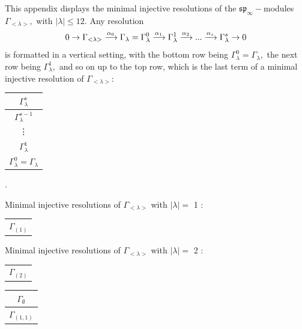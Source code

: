 \documentclass[main.tex]{subfiles}
\begin{document}
This appendix displays the minimal injective resolutions of the $\mathfrak{sp}_\infty-$modules $\Gamma_{<\lambda>},$ with $|\lambda|\leq 12$. Any resolution
$$0\to\Gamma_{<\lambda>}\xrightarrow[]{\alpha_0}\Gamma_{\lambda} = \Gamma_\lambda^0\xrightarrow[]{\alpha_1} \Gamma_\lambda^1\xrightarrow[]{\alpha_2} ...\xrightarrow[]{\alpha_{s}}\Gamma_\lambda^s \to 0$$ is formatted in a vertical setting, with the bottom row being $\Gamma^0_\lambda = \Gamma_\lambda,$ the next row being $\Gamma^1_\lambda,$ and so on up to the top row, which is the last term of a minimal injective resolution of $\Gamma_{<\lambda>}$: 
\begin{table}[H]
\centering
\begin{tabular}{c}
     $\Gamma_\lambda^s$ \\ \hline
     $\Gamma_\lambda^{s-1}$ \\ \hline
     \vdots \\ \hline
     $\Gamma_\lambda^1$ \\ \hline
     $\Gamma_\lambda^0 = \Gamma_\lambda$
\end{tabular}\hspace{0.2cm}.
\end{table}

\bigskip
Minimal injective resolutions of $\Gamma_{<\lambda>}$ with $|\lambda| = $ 1 : \\
\begin{minipage}{1\textwidth}
\centering
\begin{tabular}{c}
$\Gamma_{(
1
)}$
\\
\end{tabular}\end{minipage}

\bigskip
Minimal injective resolutions of $\Gamma_{<\lambda>}$ with $|\lambda| = $ 2 : \\
\begin{minipage}{.5\textwidth}
\centering
\begin{tabular}{c}
$\Gamma_{(
2
)}$
\\
\end{tabular}\end{minipage}
\begin{minipage}{.5\textwidth}
\centering
\begin{tabular}{c}
$\Gamma_\emptyset$
\\ \hline
$\Gamma_{(
1 , 
1
)}$
\\
\end{tabular}\end{minipage}
\end{document}

